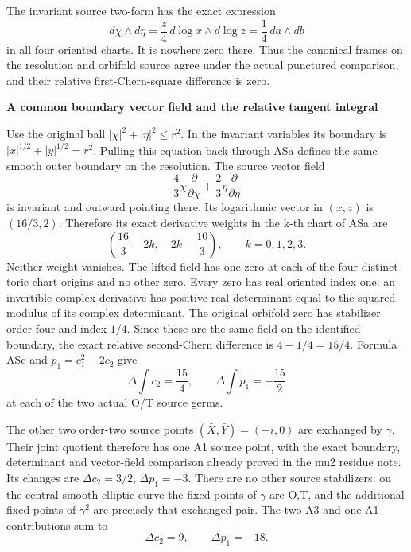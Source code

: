 The invariant source two-form has the exact expression
\[
 d\chi\wedge d\eta
 =\frac z4\,d\log x\wedge d\log z
 =\frac14\,da\wedge db
\tag{ASc}
\]
in all four oriented charts. It is nowhere zero there. Thus the
canonical frames on the resolution and orbifold source agree
under the actual punctured comparison, and their relative
first-Chern-square difference is zero.

\par

\medskip\noindent\textbf{A common boundary vector field and the relative tangent integral}

\par\nobreak

Use the original ball \(|\chi|^2+|\eta|^2\le r^2\). In
the invariant variables its boundary is
\(|x|^{1/2}+|y|^{1/2}=r^2\). Pulling this equation back through
ASa defines the same smooth outer boundary on the resolution.
The source vector field
\[
 \frac43\chi\frac{\partial}{\partial\chi}
 +\frac23\eta\frac{\partial}{\partial\eta}
\tag{ASd}
\]
is invariant and outward pointing there. Its logarithmic vector
in \((x,z)\) is \((16/3,2)\). Therefore its exact derivative
weights in the k-th chart of ASa are
\[
 \left(\frac{16}{3}-2k,\quad 2k-\frac{10}{3}\right),
 \qquad k=0,1,2,3.
\tag{ASe}
\]
Neither weight vanishes. The lifted field has one zero at each
of the four distinct toric chart origins and no other zero.
Every zero has real oriented index one: an invertible complex
derivative has positive real determinant equal to the squared
modulus of its complex determinant. The original orbifold
zero has stabilizer order four and index \(1/4\). Since these
are the same field on the identified boundary, the exact
relative second-Chern difference is \(4-1/4=15/4\). Formula
ASc and \(p_1=c_1^2-2c_2\) give
\[
 \Delta\!\int c_2=\frac{15}{4},\qquad
 \Delta\!\int p_1=-\frac{15}{2}
\tag{ASf}
\]
at each of the two actual O/T source germs.

The other two order-two source points \((\bar X,\bar Y)=(\pm i,0)\)
are exchanged by \(\gamma\). Their joint quotient therefore has
one A1 source point, with the exact boundary, determinant and
vector-field comparison already proved in the mu2 residue note.
Its changes are \(\Delta c_2=3/2\), \(\Delta p_1=-3\).
There are no other source stabilizers: on the central smooth
elliptic curve the fixed points of \(\gamma\) are O,T, and
the additional fixed points of \(\gamma^2\) are precisely
that exchanged pair. The two A3 and one A1 contributions sum to
\[
 \Delta c_2=9,\qquad \Delta p_1=-18.
\tag{ASg}
\]

